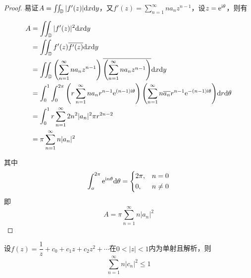 \begin{proof}
    
    易证$A = \iint_{\mathbb{D}}{|f'(z)|}\mathrm{d} x\mathrm{d} y$，又$f'(z) = \sum\limits_{n = 1}^{\infty}{na_nz^{n - 1}}$，设$z = \mathrm{e}^{\mathrm{i}\theta}$，则有

    \begin{align*}
        A & = \iint_{\mathbb{D}}{|f'(z)|^2}\mathrm{d} x\mathrm{d} y \\ 
          & = \iint_{\mathbb{D}}{f'(z)\overline{{f'(z)}}}\mathrm{d} x\mathrm{d} y \\
          & = \iint_{\mathbb{D}}{\left( \sum\limits_{n = 1}^{\infty}{na_nz^{n - 1}} \right)\overline{\left( \sum\limits_{n = 1}^{\infty}{na_nz^{n - 1}} \right)}}\mathrm{d} x\mathrm{d} y \\
          & = \int_{0}^{1}{\int_{0}^{2 \pi}{\left( r\sum\limits_{n = 1}^{\infty}{na_nr^{n - 1}\mathrm{e}^{(n - 1)\mathrm{i}\theta}} \right)\left( \sum\limits_{n = 1}^{\infty}{n\overline{a_n}r^{n - 1}\mathrm{e}^{-(n - 1)\mathrm{i}\theta}} \right)}\mathrm{d} r}\mathrm{d} \theta \\
          & = \int_{0}^{1}{r\sum\limits_{n = 1}^{\infty}{2n^2|a_n|^2 \pi r^{2n - 2}}} \\
          & = \pi \sum\limits_{n = 1}^{\infty}{n|a_n|^2}
    \end{align*}

    其中
    \[
    \int_{o}^{2\pi}{\mathrm{e}^{\mathrm{i} n\theta}}\mathrm{d} \theta = 
    \left\{
        \begin{aligned}
            &2\pi, & n = 0 \\
            &0, & n \neq 0 \\
        \end{aligned}
    \right.
    \]
    即
    \[A = \pi \sum\limits_{n = 1}^{\infty}{n|a_n|^2}\]

\end{proof}


\begin{theorem}
    
    设$f(z) = \dfrac{1}{z} + c_0 + c_1 z + c_2 z
    ^2 + \cdots$在$0 < |z| < 1$内为单射且解析，则
    \[\sum\limits_{n = 1}^{\infty}{n|c_n|^2} \leq 1\]
    
\end{theorem}

